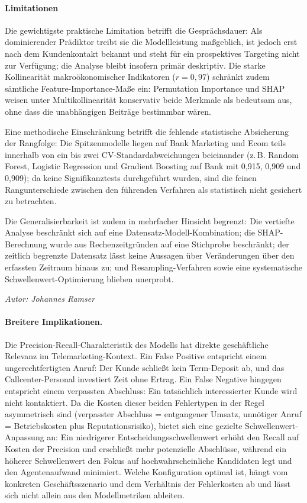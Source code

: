 \documentclass[10pt]{scrartcl}
\begin{document}
\paragraph{Limitationen}

Die gewichtigste praktische Limitation betrifft die Gesprächsdauer: Als dominierender Prädiktor treibt sie die Modellleistung maßgeblich, ist jedoch erst nach dem Kundenkontakt bekannt und steht für ein prospektives Targeting nicht zur Verfügung; die Analyse bleibt insofern primär deskriptiv. Die starke Kollinearität makroökonomischer Indikatoren ($r=0{,}97$) schränkt zudem sämtliche Feature-Importance-Maße ein: Permutation Importance und SHAP weisen unter Multikollinearität konservativ beide Merkmale als bedeutsam aus, ohne dass die unabhängigen Beiträge bestimmbar wären.

Eine methodische Einschränkung betrifft die fehlende statistische Absicherung der Rangfolge: Die Spitzenmodelle liegen auf Bank Marketing und Ecom teils innerhalb von ein bis zwei CV-Standardabweichungen beieinander (z.\,B. Random Forest, Logistic Regression und Gradient Boosting auf Bank mit 0{,}915, 0{,}909 und 0{,}909); da keine Signifikanztests durchgeführt wurden, sind die feinen Rangunterschiede zwischen den führenden Verfahren als statistisch nicht gesichert zu betrachten.

Die Generalisierbarkeit ist zudem in mehrfacher Hinsicht begrenzt: Die vertiefte Analyse beschränkt sich auf eine Datensatz-Modell-Kombination; die SHAP-Berechnung wurde aus Rechenzeitgründen auf eine Stichprobe beschränkt; der zeitlich begrenzte Datensatz lässt keine Aussagen über Veränderungen über den erfassten Zeitraum hinaus zu; und Resampling-Verfahren sowie eine systematische Schwellenwert-Optimierung blieben unerprobt.

\begin{flushright}\textit{Autor: Johannes Ramser}\end{flushright}

\paragraph{Breitere Implikationen.}

Die Precision-Recall-Charakteristik des Modells hat direkte geschäftliche Relevanz im Telemarketing-Kontext. Ein False Positive entspricht einem ungerechtfertigten Anruf: Der Kunde schließt kein Term-Deposit ab, und das Callcenter-Personal investiert Zeit ohne Ertrag. Ein False Negative hingegen entspricht einem verpassten Abschluss: Ein tatsächlich interessierter Kunde wird nicht kontaktiert. Da die Kosten dieser beiden Fehlertypen in der Regel asymmetrisch sind (verpasster Abschluss = entgangener Umsatz, unnötiger Anruf = Betriebskosten plus Reputationsrisiko), bietet sich eine gezielte Schwellenwert-Anpassung an: Ein niedrigerer Entscheidungsschwellenwert erhöht den Recall auf Kosten der Precision und erschließt mehr potenzielle Abschlüsse, während ein höherer Schwellenwert den Fokus auf hochwahrscheinliche Kandidaten legt und den Agentenaufwand minimiert. Welche Konfiguration optimal ist, hängt vom konkreten Geschäftsszenario und dem Verhältnis der Fehlerkosten ab und lässt sich nicht allein aus den Modellmetriken ableiten.
\end{document}
